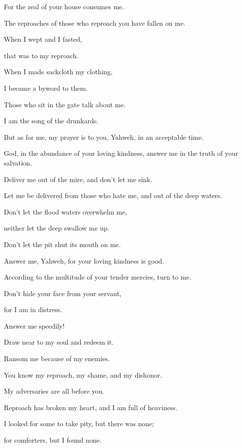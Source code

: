 {\par }{\Q {}For the zeal of your house consumes me.
\par }{\QB The reproaches of those who reproach you have fallen on me.
\par }{\Q {}When I wept and I fasted,
\par }{\QB that was to my reproach.
\par }{\Q {}When I made sackcloth my clothing,
\par }{\QB I became a byword to them.
\par }{\Q {}Those who sit in the gate talk about me.
\par }{\QB I am the song of the drunkards.
\par }{\Q {}But as for me, my prayer is to you, Yahweh, in an acceptable time.
\par }{\QB God, in the abundance of your loving kindness, answer me in the truth of your salvation.
\par }{\Q {}Deliver me out of the mire, and don’t let me sink.
\par }{\QB Let me be delivered from those who hate me, and out of the deep waters.
\par }{\Q {}Don’t let the flood waters overwhelm me,
\par }{\QB neither let the deep swallow me up.
\par }{\QB Don’t let the pit shut its mouth on me.
\par }{\Q {}Answer me, Yahweh, for your loving kindness is good.
\par }{\QB According to the multitude of your tender mercies, turn to me.
\par }{\Q {}Don’t hide your face from your servant,
\par }{\QB for I am in distress.
\par }{\QB Answer me speedily!
\par }{\Q {}Draw near to my soul and redeem it.
\par }{\QB Ransom me because of my enemies.
\par }{\Q {}You know my reproach, my shame, and my dishonor.
\par }{\QB My adversaries are all before you.
\par }{\Q {}Reproach has broken my heart, and I am full of heaviness.
\par }{\QB I looked for some to take pity, but there was none;
\par }{\QB for comforters, but I found none.
}
